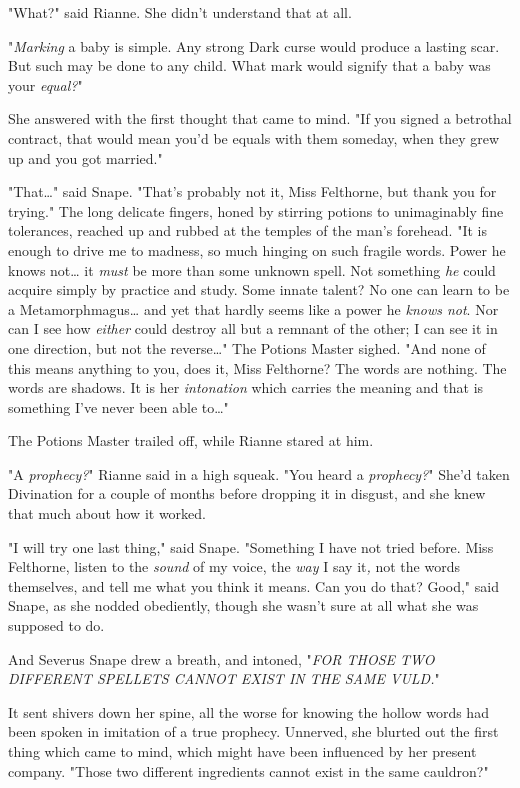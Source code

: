 "What?" said Rianne. She didn't understand that at all.

"\emph{Marking} a baby is simple. Any strong Dark curse would produce a lasting 
scar. But such may be done to any child. What mark would signify that a baby 
was your \emph{equal?}"

She answered with the first thought that came to mind. "If you signed a 
betrothal contract, that would mean you'd be equals with them someday, when 
they grew up and you got married."

"That{\ldots}" said Snape. "That's probably not it, Miss Felthorne, but thank 
you for trying." The long delicate fingers, honed by stirring potions to 
unimaginably fine tolerances, reached up and rubbed at the temples of the man's 
forehead. "It is enough to drive me to madness, so much hinging on such fragile 
words. Power he knows not{\ldots} it \emph{must} be more than some unknown 
spell. Not something \emph{he} could acquire simply by practice and study. Some 
innate talent? No one can learn to be a Metamorphmagus{\ldots} and yet that 
hardly seems like a power he \emph{knows not}. Nor can I see how \emph{either} 
could destroy all but a remnant of the other; I can see it in one direction, 
but not the reverse{\ldots}" The Potions Master sighed. "And none of this means 
anything to you, does it, Miss Felthorne? The words are nothing. The words are 
shadows. It is her \emph{intonation} which carries the meaning and that is 
something I've never been able to{\ldots}"

The Potions Master trailed off, while Rianne stared at him.

"A \emph{prophecy?}" Rianne said in a high squeak. "You heard a 
\emph{prophecy?}" She'd taken Divination for a couple of months before dropping 
it in disgust, and she knew that much about how it worked.

"I will try one last thing," said Snape. "Something I have not tried before. 
Miss Felthorne, listen to the \emph{sound} of my voice, the \emph{way} I say 
it\emph{,} not the words themselves, and tell me what you think it means. Can 
you do that? Good," said Snape, as she nodded obediently, though she wasn't 
sure at all what she was supposed to do.

And Severus Snape drew a breath, and intoned, "\emph{FOR THOSE TWO DIFFERENT 
SPELLETS CANNOT EXIST IN THE SAME VULD.}"

It sent shivers down her spine, all the worse for knowing the hollow words had 
been spoken in imitation of a true prophecy. Unnerved, she blurted out the 
first thing which came to mind, which might have been influenced by her present 
company. "Those two different ingredients cannot exist in the same cauldron?"

